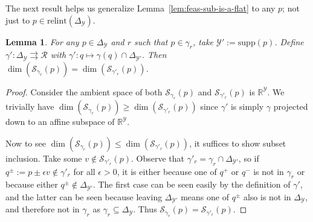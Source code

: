 \documentclass{article}
\newcommand{\Comments}{1}
\newcommand{\mytodo}[2]{\ifnum\Comments=1%
	\todo[linecolor=#1!80!black,backgroundcolor=#1,bordercolor=#1!80!black]{#2}\fi}
\newcommand{\jessiet}[1]{\mytodo{purple!20!white}{JF: #1}}
\newcommand{\reals}{\mathbb{R}}
\newcommand{\simplex}{\Delta_\Y}
\newcommand{\relint}[1]{\mathrm{relint}(#1)}
\newcommand{\supp}{\mathrm{supp}}
\newcommand{\spn}{\mathrm{span}}
\newcommand{\R}{\mathcal{R}}
\newcommand{\Sc}{\mathcal{S}}  %
\newcommand{\Y}{\mathcal{Y}}
\newcommand{\toto}{\rightrightarrows}
\newtheorem{lemma}{Lemma}
\begin{document}
The next result helps us generalize Lemma~\ref{lem:feas-sub-is-a-flat} to any $p$; not just to $p \in \relint{\simplex}$.
\newcommand{\simplexp}{\Delta_{\Y'}}
\begin{lemma}\label{lem:p-boundary-fsd}
	For any $p \in \simplex$ and $r$ such that $p \in \gamma_r$, take $\Y' := \supp(p)$.
	Define $\gamma' : \simplex \toto \R$ with $\gamma' : q \mapsto \gamma(q) \cap \simplexp$.
	Then $\dim(\Sc_{\gamma_r}(p)) = \dim(\Sc_{\gamma'_r}(p))$.
\end{lemma}
\begin{proof}
	Consider the ambient space of both $\Sc_{\gamma_r}(p)$ and $\Sc_{\gamma'_r}(p)$ is $\reals^\Y$.
	We trivially have $\dim(\Sc_{\gamma_r}(p)) \geq \dim(\Sc_{\gamma'_r}(p))$ since $\gamma'$ is simply $\gamma$ projected down to an affine subspace of $\reals^\Y$.
	
	Now to see $\dim(\Sc_{\gamma_r}(p)) \leq \dim(\Sc_{\gamma'_r}(p))$, it suffices to show subset inclusion.
	Take some $v \not \in \Sc_{\gamma'_r}(p)$.
	Observe that $\gamma'_r = \gamma_r \cap \simplexp$, so if $q^\pm := p \pm \epsilon v \not \in \gamma'_r$ for all $\epsilon > 0$, it is either because one of $q^+$ or $q^-$ is not in $\gamma_r$ or because either $q^\pm \not \in \simplexp$.
	The first case can be seen easily by the definition of $\gamma'$, and the latter can be seen because leaving $\simplexp$ means one of $q^\pm$ also is not in $\simplex$, and therefore not in $\gamma_r$ as $\gamma_r \subseteq \simplex$.
	Thus $\Sc_{\gamma_r}(p) = \Sc_{\gamma'_r}(p)$.
\end{proof}
\end{document}
